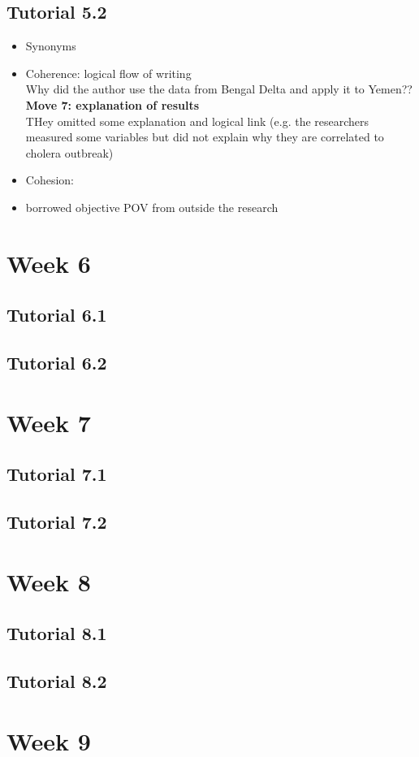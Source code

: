 \documentclass{article}
\begin{document}
\begin{multicols}{2}
\subsection{Tutorial 5.2}
\begin{itemize}
	\item Synonyms
	\item Coherence: logical flow of writing\\
	Why did the author use the data from Bengal Delta and apply it to Yemen??
	\textbf{Move 7: explanation of results}\\
	THey omitted some explanation and logical link (e.g. the researchers measured some variables but did not explain why they are correlated to cholera outbreak)
	\item Cohesion:
	\item borrowed objective POV from outside the research
\end{itemize}
\section{Week 6}
\subsection{Tutorial 6.1}
\subsection{Tutorial 6.2}
\section{Week 7}
\subsection{Tutorial 7.1}
\subsection{Tutorial 7.2}
\section{Week 8}
\subsection{Tutorial 8.1}
\subsection{Tutorial 8.2}
\section{Week 9}

\end{multicols}
\end{document}

